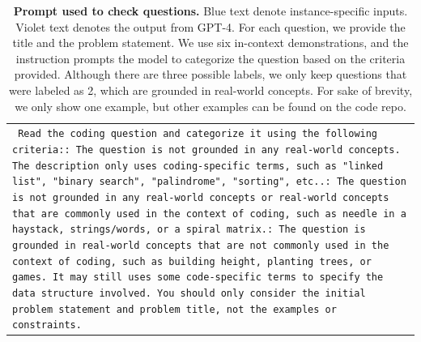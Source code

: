 
\begin{table}[!th]
    \centering
    \small
    \caption{
        \textbf{Prompt used to check \leetcode questions.} {\color{blue} Blue text} denote instance-specific inputs. {\color{violet} Violet text} denotes the output from GPT-4.
        For each question, we provide the title and the problem statement.
        We use six in-context demonstrations, and the instruction prompts the model to categorize the question based on the criteria provided.
        Although there are three possible labels, we only keep questions that were labeled as 2, which are grounded in real-world concepts.
        For sake of brevity, we only show one example, but other examples can be found on the code repo. 
    }
    \label{tab:leetcode_check}
    \begin{tabular}{>{\raggedright\arraybackslash\tt}p{}<{}}
        \toprule
            \vspace{-1em}
            Read the coding question and categorize it using the following criteria:\newline%
 0: The question is not grounded in any real{-}world concepts. The description only uses coding{-}specific terms, such as "linked list", "binary search", "palindrome", "sorting", etc..\newline%
 1: The question is not grounded in any real{-}world concepts or real{-}world concepts that are commonly used in the context of coding, such as needle in a haystack, strings/words, or a spiral matrix.\newline%
 2: The question is grounded in real{-}world concepts that are not commonly used in the context of coding, such as building height, planting trees, or games. It may still uses some code{-}specific terms to specify the data structure involved.\newline%
\newline%
You should only consider the initial problem statement and problem title, not the examples or constraints.\newline%

\end{tabular}
\end{table}
